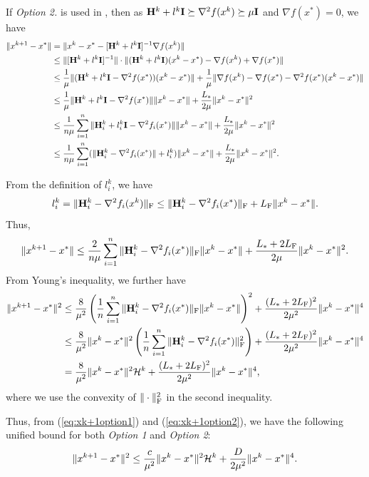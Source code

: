 \documentclass[11pt]{article}
\begin{document}
	If {\em Option 2.} is used in , then as $\mathbf{H}^k + l^k\mathbf{I} \succeq \nabla^2 f(x^k) \succeq \mu \mathbf{I}$ and $\nabla f(x^*) = 0$, we have 
	\begin{align*}
		\|x^{k+1} - x^*\| &= \|x^k - x^* - [\mathbf{H}^k + l^k\mathbf{I}]^{-1} \nabla f(x^k) \| \\
		& \leq \|[\mathbf{H}^k + l^k \mathbf{I}]^{-1}\| \cdot \|(\mathbf{H}^k + l^k \mathbf{I}) (x^k-x^*) - \nabla f(x^k) + \nabla f(x^*)\| \\ 
		& \leq \frac{1}{\mu} \|(\mathbf{H}^k + l^k \mathbf{I} - \nabla^2 f(x^*))(x^k-x^*)\| + \frac{1}{\mu} \|\nabla f(x^k) - \nabla f(x^*) - \nabla^2 f(x^*) (x^k-x^*)\| \\ 
		& \leq \frac{1}{\mu} \|\mathbf{H}^k + l^k\mathbf{I} - \nabla^2 f(x^*)\| \|x^k-x^*\| + \frac{L_{*}}{2\mu}\|x^k-x^*\|^2 \\ 
		& \leq \frac{1}{n\mu} \sum_{i=1}^n \|\mathbf{H}_i^k + l_i^k\mathbf{I} - \nabla^2 f_i(x^*)\| \|x^k-x^*\| + \frac{L_{*}}{2\mu}\|x^k-x^*\|^2 \\ 
		& \leq \frac{1}{n\mu} \sum_{i=1}^n (\|\mathbf{H}_i^k - \nabla^2 f_i(x^*)\| + l_i^k )\|x^k-x^*\| +  \frac{L_{*}}{2\mu}\|x^k-x^*\|^2. 
	\end{align*}
	
	From the definition of $l_i^k$, we have 
	$$
	l_i^k = \|\mathbf{H}_i^k - \nabla^2 f_i(x^k)\|_{\rm F} \leq \|\mathbf{H}_i^k - \nabla^2 f_i(x^*)\|_{\rm F} + L_{\rm F} \|x^k-x^*\|. 
	$$
	Thus, 
	$$
	\|x^{k+1} - x^*\|  \leq \frac{2}{n\mu} \sum_{i=1}^n \|\mathbf{H}_i^k - \nabla^2 f_i(x^*)\|_{\rm F} \|x^k-x^*\| + \frac{L_{*}+2L_{\rm F}}{2\mu}\|x^k-x^*\|^2. 
	$$
	From Young's inequality, we further have 
	\begin{align}
		\|x^{k+1} - x^*\|^2 & \leq \frac{8}{\mu^2} \left(  \frac{1}{n} \sum_{i=1}^n \|\mathbf{H}_i^k - \nabla^2 f_i(x^*)\|_{\rm F} \|x^k-x^*\|   \right)^2 + \frac{(L_{*}+2L_{\rm F})^2}{2\mu^2} \|x^k-x^*\|^4 \nonumber \\ 
		& \leq \frac{8}{\mu^2} \|x^k-x^*\|^2 \left(  \frac{1}{n} \sum_{i=1}^n \|\mathbf{H}_i^k - \nabla^2 f_i(x^*)\|^2_{\rm F}  \right) +  \frac{(L_{*}+2L_{\rm F})^2}{2\mu^2} \|x^k-x^*\|^4 \nonumber \\ 
		& = \frac{8}{\mu^2} \|x^k-x^*\|^2 {\cal H}^k + \frac{(L_{*}+2L_{\rm F})^2}{2\mu^2} \|x^k-x^*\|^4,  \label{eq:xk+1option2}
	\end{align}
	where we use the convexity of $\|\cdot\|^2_{\rm F}$ in the second inequality. 
	
	Thus, from (\ref{eq:xk+1option1}) and (\ref{eq:xk+1option2}), we have the following unified bound for both {\em Option 1} and {\em Option 2}:
	\begin{equation}\label{eq:xk+1U}
		\|x^{k+1} - x^*\|^2 \leq \frac{c}{\mu^2} \|x^k-x^*\|^2 {\cal H}^k + \frac{D}{2\mu^2} \|x^k-x^*\|^4. 
	\end{equation}
	
\end{document}
